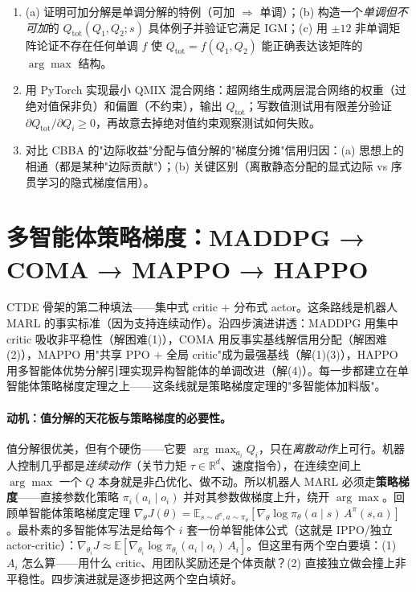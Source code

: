 \begin{practice}
\begin{enumerate}
  \item (a) 证明可加分解是单调分解的特例（可加 $\Rightarrow$ 单调）；(b) 构造一个\emph{单调但不可加}的 $Q_{\text{tot}}(Q_1,Q_2;s)$ 具体例子并验证它满足 IGM；(c) 用 $\pm12$ 非单调矩阵论证不存在任何单调 $f$ 使 $Q_{\text{tot}}=f(Q_1,Q_2)$ 能正确表达该矩阵的 $\arg\max$ 结构。
  \item 用 PyTorch 实现最小 QMIX 混合网络：超网络生成两层混合网络的权重（过绝对值保非负）和偏置（不约束），输出 $Q_{\text{tot}}$；写数值测试用有限差分验证 $\partial Q_{\text{tot}}/\partial Q_i\ge0$，再故意去掉绝对值约束观察测试如何失败。
  \item 对比 CBBA 的"边际收益"分配与值分解的"梯度分摊"信用归因：(a) 思想上的相通（都是某种"边际贡献"）；(b) 关键区别（离散静态分配的显式边际 vs 序贯学习的隐式梯度信用）。
\end{enumerate}
\end{practice}

\section{多智能体策略梯度：MADDPG → COMA → MAPPO → HAPPO}
\label{sec:sm-policygrad}

CTDE 骨架的第二种填法——集中式 critic $+$ 分布式 actor。这条路线是机器人 MARL 的事实标准（因为支持连续动作）。沿四步演进讲透：MADDPG 用集中 critic 吸收非平稳性（解困难(1)），COMA 用反事实基线解信用分配（解困难(2)），MAPPO 用"共享 PPO $+$ 全局 critic"成为最强基线（解(1)(3)），HAPPO 用多智能体优势分解引理实现异构智能体的单调改进（解(4)）。每一步都建立在单智能体策略梯度定理之上——这条线就是策略梯度定理的"多智能体加料版"。

\paragraph{动机：值分解的天花板与策略梯度的必要性。}
值分解很优美，但有个硬伤——它要 $\arg\max_{a_i}Q_i$，只在\emph{离散动作}上可行。机器人控制几乎都是\emph{连续动作}（关节力矩 $\tau\in\mathbb{R}^d$、速度指令），在连续空间上 $\arg\max$ 一个 $Q$ 本身就是非凸优化、做不动。所以机器人 MARL 必须走\textbf{策略梯度}——直接参数化策略 $\pi_i(a_i\mid o_i)$ 并对其参数做梯度上升，绕开 $\arg\max$。回顾单智能体策略梯度定理 $\nabla_\theta J(\theta)=\mathbb{E}_{s\sim d^\pi,a\sim\pi_\theta}[\nabla_\theta\log\pi_\theta(a\mid s)\,A^\pi(s,a)]$。最朴素的多智能体写法是给每个 $i$ 套一份单智能体公式（这就是 IPPO/独立 actor-critic）：$\nabla_{\theta_i}J\approx\mathbb{E}[\nabla_{\theta_i}\log\pi_{\theta_i}(a_i\mid o_i)\,A_i]$。但这里有两个空白要填：(1) $A_i$ 怎么算——用什么 critic、用团队奖励还是个体贡献？(2) 直接独立做会撞上非平稳性。四步演进就是逐步把这两个空白填好。

